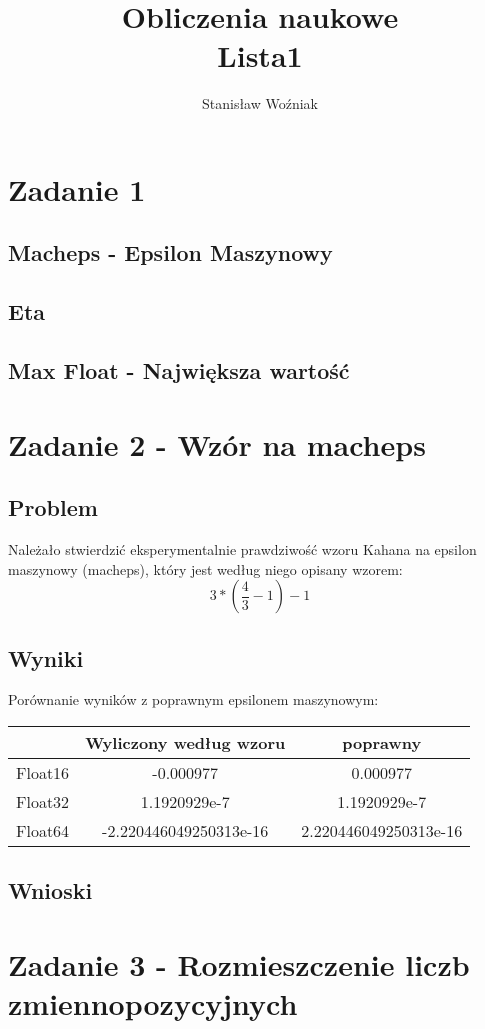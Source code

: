 \documentclass[11pt, a4paper]{article}
\title{Obliczenia naukowe\\Lista1}
\author{Stanisław Woźniak}
\date{}
\begin{document}
\maketitle


\section{Zadanie 1}
\subsection{Macheps - Epsilon Maszynowy}
\subsection{Eta}
\subsection{Max Float - Największa wartość}

\section{Zadanie 2 - Wzór na macheps}
\subsection{Problem}
Należało stwierdzić eksperymentalnie prawdziwość wzoru Kahana na epsilon maszynowy (macheps), który jest według niego opisany wzorem:
\[3*(\frac{4}{3} - 1) - 1\]
\subsection{Wyniki}
Porównanie wyników z poprawnym epsilonem maszynowym:
\begin{center}
\begin{tabular}{ c|c|c}
  & Wyliczony według wzoru & poprawny\\
  \hline
 Float16 & -0.000977 & 0.000977\\
 Float32 & 1.1920929e-7 & 1.1920929e-7\\
 Float64 & -2.220446049250313e-16 & 2.220446049250313e-16
\end{tabular}
\end{center}
\subsection{Wnioski}


\section{Zadanie 3 - Rozmieszczenie liczb zmiennopozycyjnych}
\end{document}
